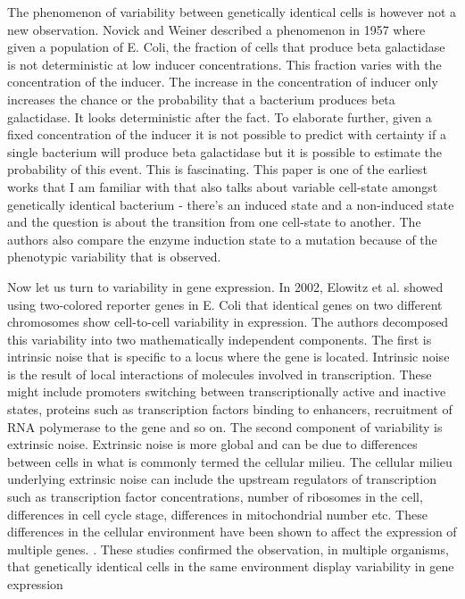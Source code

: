 The phenomenon of variability between genetically identical cells is however not a new observation. Novick and Weiner \cite{novick_enzyme_1957} \cite{raj_nature_2008} described a phenomenon in 1957 where given a population of E. Coli, the fraction of cells that produce beta galactidase is not deterministic at low inducer concentrations. This fraction varies with the concentration of the inducer. The increase in the concentration of inducer only increases the chance or the probability that a bacterium produces beta galactidase. It looks deterministic after the fact. To elaborate further, given a fixed concentration of the inducer it is not possible to predict with certainty if a single bacterium will produce beta galactidase but it is possible to estimate the probability of this event. This is fascinating. This paper is one of the earliest works that I am familiar with that also talks about variable cell-state amongst genetically identical bacterium - there's an induced state and a non-induced state and the  question is about the transition from one cell-state to another. The authors also compare the enzyme induction state to a mutation because of the phenotypic variability that is observed.

Now let us turn to variability in gene expression. In 2002, Elowitz et al.  \cite{elowitz_stochastic_2002} showed using two-colored reporter genes in E. Coli that identical genes on two different chromosomes show cell-to-cell variability in expression. The authors decomposed this variability into two mathematically independent components. The first is intrinsic noise that is specific to a locus where the gene is located. Intrinsic noise is the result of local interactions of molecules involved in transcription. These might include promoters switching between transcriptionally active and inactive states, proteins such as transcription factors binding to enhancers, recruitment of RNA polymerase to the gene and so on. The second component of variability is extrinsic noise. Extrinsic noise is more global and can be due to differences between cells in what is commonly termed the cellular milieu. The cellular milieu underlying extrinsic noise can include the upstream regulators of transcription such as transcription factor concentrations, number of ribosomes in the cell, differences in cell cycle stage, differences in mitochondrial number etc. These differences in the cellular environment have been shown to affect the expression of multiple genes. \cite{raser_control_2004,blake_phenotypic_2006,blake_noise_2003,raser_noise_2005,volfson_origins_2006}. These studies confirmed the observation, in multiple organisms, that genetically identical cells in the same environment display variability in gene expression

